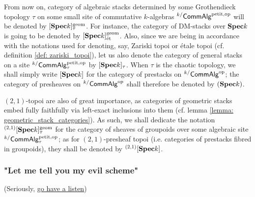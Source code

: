                     \begin{convention} \label{conv: algebraic_stacks_notations}
                        From now on, category of algebraic stacks determined by some Grothendieck topology $\tau$ on some small site of commutative $k$-algebras ${}^{k/}\mathsf{Comm}\mathsf{Alg}^{\mathrm{petit}, \mathrm{op}}$ will be denoted by $[\mathbf{Spec} k]^{\mathrm{geom}}_{\tau}$. For instance, the category of DM-stacks over $\mathbf{Spec} k$ is going to be denoted by $[\mathbf{Spec} k]^{\mathrm{geom}}_{\mathrm{\acute{e}t}}$. Also, since we are being in accordance with the notations used for denoting, say, Zariski topoi or \'etale topoi (cf. definition \ref{def: zariski_topoi}), let us also denote the category of general stacks on a site ${}^{k/}\mathsf{Comm}\mathsf{Alg}^{\mathrm{petit}, \mathrm{op}}_{\tau}$ by $[\mathbf{Spec} k]_{\tau}$. When $\tau$ is the chaotic topology, we shall simply write $[\mathbf{Spec} k]$ for the category of prestacks on ${}^{k/}\mathsf{Comm}\mathsf{Alg}^{\mathrm{op}}$; the category of presheaves on ${}^{k/}\mathsf{Comm}\mathsf{Alg}^{\mathrm{op}}$ shall therefore be denoted by $(\mathbf{Spec} k)$.
                        
                        $(2, 1)$-topoi are also of great importance, as categories of geometric stacks embed fully faithfully via left-exact inclusions into them (cf. lemma \ref{lemma: geometric_stack_categories}). As such, we shall dedicate the notation ${}^{(2, 1)}[\mathbf{Spec} k]^{\mathrm{geom}}_{\tau}$ for the category of sheaves of groupoids over some algebraic site ${}^{k/}\mathsf{Comm}\mathsf{Alg}_{\tau}^{\mathrm{petit}, \mathrm{op}}$; as for $(2, 1)$-presheaf topoi (i.e. categories of prestacks fibred in groupoids), they shall be denoted by ${}^{(2, 1)}[\mathbf{Spec} k]$. 
                    \end{convention}
                
            \subsubsection{"Let me tell you my evil scheme"}
                (Seriously, \href{https://www.youtube.com/watch?v=VnzE6zOy9hA}{\underline{go have a listen}})
                
